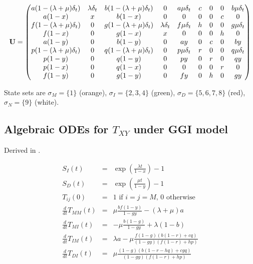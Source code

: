 \documentclass{article}
\begin{document}
\[
 {\bf U} =
  \begin{pmatrix}
a (1-(\lambda+\mu) \delta_t) & \lambda \delta_t & b (1-(\lambda+\mu) \delta_t) & 0 & a \mu \delta_t & c & 0 & 0 & b \mu \delta_t \\
a (1-x) & x & b (1-x) & 0 & 0 & 0 & 0 & c & 0 \\
f (1-(\lambda+\mu) \delta_t) & 0 & g (1-(\lambda+\mu) \delta_t) & \lambda \delta_t & f \mu \delta_t & h & 0 & 0 & g \mu \delta_t \\
f (1-x) & 0 & g (1-x) & x & 0 & 0 & 0 & h & 0 \\
a (1-y) & 0 & b (1-y) & 0 & a y & 0 & c & 0 & b y \\
p (1-(\lambda+\mu) \delta_t) & 0 & q (1-(\lambda+\mu) \delta_t) & 0 & p \mu \delta_t & r & 0 & 0 & q \mu \delta_t \\
p (1-y) & 0 & q (1-y) & 0 & p y & 0 & r & 0 & q y \\
p (1-x) & 0 & q (1-x) & 0 & 0 & 0 & 0 & r & 0 \\
f (1-y) & 0 & g (1-y) & 0 & f y & 0 & h & 0 & g y    
  \end{pmatrix}
\]

State sets are
$\sigma_M=\{1\}$ (orange),
$\sigma_I=\{2,3,4\}$ (green),
$\sigma_D=\{5,6,7,8\}$ (red),
$\sigma_N=\{9\}$ (white).
  
\subsection{Algebraic ODEs for $T_{XY}$ under GGI model}

Derived in \cite{Holmes2020}.

\begin{eqnarray*}
S_I(t) & = & \exp\left(\frac{\lambda t}{1-x}\right)-1 \\
S_D(t) & = & \exp\left(\frac{\mu t}{1-y}\right)-1 \\
T_{ij}(0) & = & \mbox{1 if $i=j=M$, 0 otherwise}
\\
  \frac{d}{dt} T_{MM}(t) & = &
  \mu \frac{b f (1-y)}{1 - g y}-(\lambda +\mu )a
  \nonumber \\
  \frac{d}{dt} T_{MI}(t) & = &
  -\mu \frac{b (1-g)}{1 - g y} + \lambda (1-b)
  \nonumber \\
  \frac{d}{dt} T_{IM}(t) & = &
  \lambda a - \mu \frac{f (1-g) (b (1-r)+c q)}{(1 - g y) (f (1-r)+h p)}
  \nonumber \\
  \frac{d}{dt} T_{DI}(t) & = &
  \mu \frac{(1-g) (b (1-r-h q)+c g q)}{(1-g y) (f (1-r)+h p)}
\end{eqnarray*}
\end{document}
